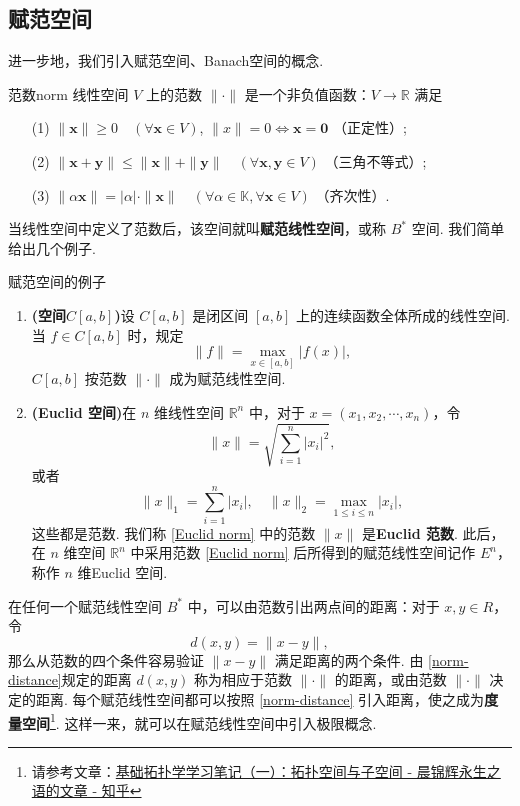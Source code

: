 \documentclass[12pt, a4paper,newtx]{ctexart}
\begin{document}
\subsection{赋范空间}
进一步地，我们引入赋范空间、Banach空间的概念. 
\begin{definition}{范数}{norm}
	线性空间 $V$ 上的范数 $\|\cdot\|$ 是一个非负值函数：$V\rightarrow \mathbb{R}$ 满足
	\begin{enumerate}
		\item[(1)] $\|\bm x\| \geqslant 0 \quad (\forall \bm x \in V)$, $\|x\| = 0 \iff \bm x = \bm 0$ （正定性）;
		\item[(2)] $\|\bm x + \bm y\| \leqslant \|\bm x\| + \|\bm y\| \quad (\forall \bm x, \bm y \in V)$ （三角不等式）;
		\item[(3)] $\|\alpha \bm x\| = |\alpha| \cdot \|\bm x\| \quad (\forall \alpha \in \mathbb{K}, \forall \bm x \in V)$ （齐次性）.
	\end{enumerate}
\end{definition}
当线性空间中定义了范数后，该空间就叫\textbf{赋范线性空间}，或称 $B^*$ 空间. 
我们简单给出几个例子. \begin{example}{赋范空间的例子}{}
	\begin{enumerate}
		\item \textbf{(空间$C[a,b]$)}设 $C[a,b]$ 是闭区间 $[a,b]$ 上的连续函数全体所成的线性空间. 当 $f \in C[a,b]$ 时，规定
		\[
		\|f\| = \max_{x \in [a,b]} |f(x)|,
		\]
		$C[a,b]$ 按范数 $\|\cdot\|$ 成为赋范线性空间.
		\item \textbf{(Euclid 空间)}在 $n$ 维线性空间 $\mathbb R^n$ 中，对于 $x = (x_1, x_2, \cdots, x_n)$，令
		\begin{equation}\label{Euclid norm}
			\|x\| = \sqrt{\sum_{i=1}^{n} |x_i|^2},
		\end{equation}
		或者
		\[
		\|x\|_1 = \sum_{i=1}^{n} |x_i|, \quad \|x\|_2 = \max_{1 \leqslant i \leqslant n} |x_i|,
		\]
		这些都是范数. 我们称 \eqref{Euclid norm} 中的范数 $\|x\|$ 是\textbf{Euclid 范数}. 此后，在 $n$ 维空间 $\mathbb R^n$ 中采用范数 \eqref{Euclid norm} 后所得到的赋范线性空间记作 $E^n$，称作 $n$ 维Euclid 空间.
	\end{enumerate}
\end{example}
在任何一个赋范线性空间 $B^*$ 中，可以由范数引出两点间的距离：对于 $x, y \in R$，令\begin{equation}\label{norm-distance}
	d(x, y) = \|x - y\|,
\end{equation}
那么从范数的四个条件容易验证 $\|x - y\|$ 满足距离的两个条件. 由 \eqref{norm-distance}规定的距离 $d(x, y)$ 称为相应于范数 $\|\cdot\|$ 的距离，或由范数 $\|\cdot\|$ 决定的距离. 每个赋范线性空间都可以按照 \eqref{norm-distance} 引入距离，使之成为\textbf{度量空间}\footnote{请参考文章：\href{https://zhuanlan.zhihu.com/p/20879868566}{基础拓扑学学习笔记（一）：拓扑空间与子空间 - 晨锦辉永生之语的文章 - 知乎}}. 这样一来，就可以在赋范线性空间中引入极限概念.
\end{document}
